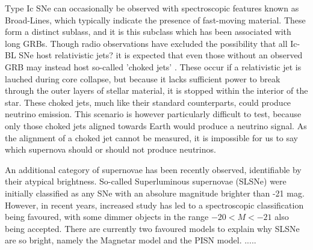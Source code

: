 \documentclass[]{article}
\begin{document}
Type Ic SNe can occasionally be observed with spectroscopic features known as Broad-Lines, which typically indicate the presence of fast-moving material. These form a distinct sublass, and it is this subclass which has been associated with long GRBs. Though radio observations have excluded the possibility that all Ic-BL SNe host relativistic jets? it is expected that even those without an observed GRB may instead host so-called 'choked jets' . These occur if a relativistic jet is lauched during core collapse, but because it lacks sufficient power to break through the outer layers of stellar material, it is stopped within the interior of the star. These choked jets, much like their standard counterparts, could produce neutrino emission. This scenario is however particularly difficult to test, because only those choked jets aligned towards Earth would produce a neutrino signal. As the alignment of a choked jet cannot be measured, it is impossible for us to say which supernova should or should not produce neutrinos. 

An additional category of supernovae has been recently observed, identifiable by their atypical brightness. So-called Superluminous supernovae (SLSNe) were initially classified as any SNe with an absolure magnitude brighter than -21 mag. However, in recent years, increased study has led to a spectroscopic classification being favoured, with some dimmer objects in the range $-20 < M < -21$ also being accepted. There are currently two favoured models to explain why SLSNe are so bright, namely the Magnetar model and the PISN model. .....
\end{document}
